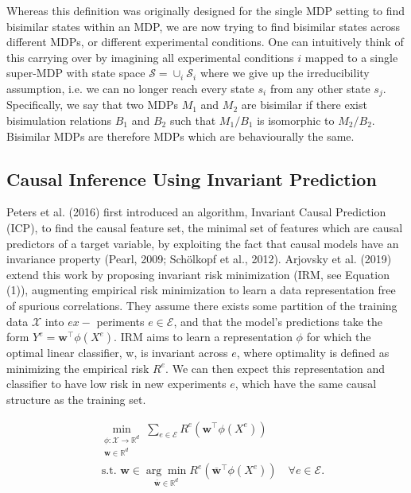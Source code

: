 \documentclass[10pt]{article}
\begin{document}
Whereas this definition was originally designed for the single MDP setting to find bisimilar states within an MDP, we are now trying to find bisimilar states across different MDPs, or different experimental conditions. One can intuitively think of this carrying over by imagining all experimental conditions $i$ mapped to a single super-MDP with state space $\mathcal{S}=\cup_{i} \mathcal{S}_{i}$ where we give up the irreducibility assumption, i.e. we can no longer reach every state $s_{i}$ from any other state $s_{j}$. Specifically, we say that two MDPs $M_{1}$ and $M_{2}$ are bisimilar if there exist bisimulation relations $B_{1}$ and $B_{2}$ such that $M_{1} / B_{1}$ is isomorphic to $M_{2} / B_{2}$. Bisimilar MDPs are therefore MDPs which are behaviourally the same.

\subsection{Causal Inference Using Invariant Prediction}
Peters et al. (2016) first introduced an algorithm, Invariant Causal Prediction (ICP), to find the causal feature set, the minimal set of features which are causal predictors of a target variable, by exploiting the fact that causal models have an invariance property (Pearl, 2009; Schölkopf et al., 2012). Arjovsky et al. (2019) extend this work by proposing invariant risk minimization (IRM, see Equation (1)), augmenting empirical risk minimization to learn a data representation free of spurious correlations. They assume there exists some partition of the training data $\mathcal{X}$ into $e x-$ periments $e \in \mathcal{E}$, and that the model's predictions take the form $Y^{e}=\mathbf{w}^{\top} \phi\left(X^{e}\right)$. IRM aims to learn a representation $\phi$ for which the optimal linear classifier, w, is invariant across $e$, where optimality is defined as minimizing the empirical risk $R^{e}$. We can then expect this representation and classifier to have low risk in new experiments $e$, which have the same causal structure as the training set.

\[
\begin{aligned}
& \min _{\substack{\phi: \mathcal{X} \rightarrow \mathbb{R}^{d} \\
\mathbf{w} \in \mathbb{R}^{d}}} \sum_{e \in \mathcal{E}} R^{e}\left(\mathbf{w}^{\top} \phi\left(X^{e}\right)\right) \\
& \text { s.t. } \mathbf{w} \in \underset{\overline{\mathbf{w}} \in \mathbb{R}^{d}}{\arg \min } R^{e}\left(\overline{\mathbf{w}}^{\top} \phi\left(X^{e}\right)\right) \quad \forall e \in \mathcal{E} .
\end{aligned}
\]
\end{document}
